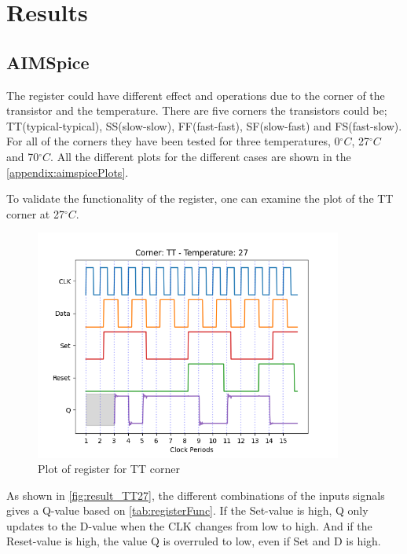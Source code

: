 \section{Results}
\label{sec:results}

\subsection{AIMSpice}

The register could have different effect and operations due to the corner of the transistor and the temperature. There are five corners the transistors could be; TT(typical-typical), SS(slow-slow), FF(fast-fast), SF(slow-fast) and FS(fast-slow).  For all of the corners they have been tested for three temperatures, 0$^\circ C$, 27$^\circ C$ and 70$^\circ C$. All the different plots for the different cases are shown in the \autoref{appendix:aimspicePlots}. 

To validate the functionality of the register, one can examine the plot of the TT corner at 27$^\circ C$. 

\begin{figure}[H]
    \centering
    \includegraphics[width=0.9\textwidth]{Figures/Aimspice_Plots/TT_27.png}
    \caption{Plot of register for TT corner}
    \label{fig:result_TT27}
\end{figure}

As shown in \autoref{fig:result_TT27}, the different combinations of the inputs signals gives a Q-value based on \autoref{tab:registerFunc}. If the Set-value is high, Q only updates to the D-value when the CLK changes from low to high. And if the Reset-value is high, the value Q is overruled to low, even if Set and D is high.

